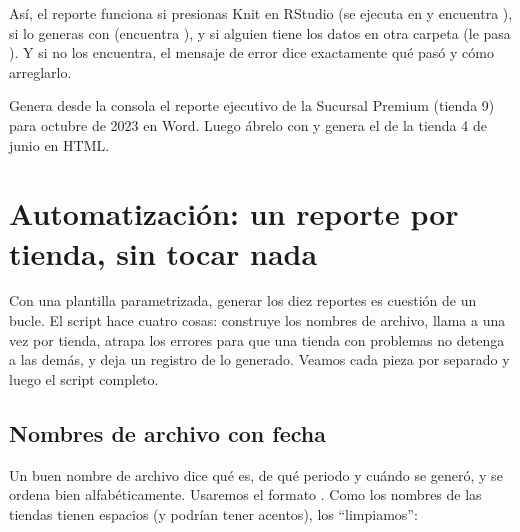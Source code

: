 Así, el reporte funciona si presionas Knit en RStudio (se ejecuta en
 y encuentra ), si lo generas con
 (encuentra
), y si alguien tiene los datos en otra carpeta (le pasa
). Y si no los encuentra,
el mensaje de error dice exactamente qué pasó y cómo arreglarlo.

\begin{hazlotu}
Genera desde la consola el reporte ejecutivo de la Sucursal Premium
(tienda 9) para octubre de 2023 en Word. Luego ábrelo con
 y genera el de la tienda 4 de junio
en HTML.
\end{hazlotu}

\section{Automatización: un reporte por tienda, sin tocar nada}
\label{sec:m8-automatizacion}

Con una plantilla parametrizada, generar los diez reportes es cuestión de un
bucle. El script  hace cuatro cosas:
construye los nombres de archivo, llama a  una vez por
tienda, atrapa los errores para que una tienda con problemas no detenga a
las demás, y deja un registro de lo generado. Veamos cada pieza por separado
y luego el script completo.

\subsection{Nombres de archivo con fecha}

Un buen nombre de archivo dice qué es, de qué periodo y cuándo se generó, y
se ordena bien alfabéticamente. Usaremos el formato
. Como los nombres
de las tiendas tienen espacios (y podrían tener acentos), los
``limpiamos'':

